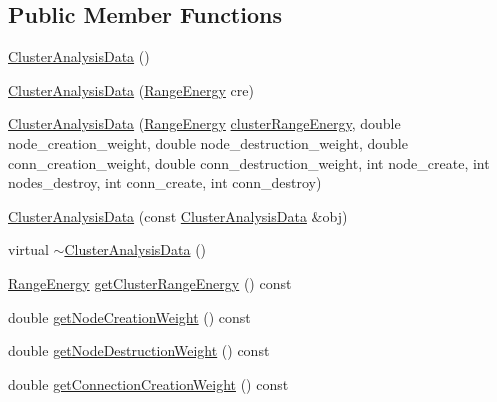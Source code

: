 \subsection*{\-Public \-Member \-Functions}
\begin{DoxyCompactItemize}
\item 
\hyperlink{classcryomesh_1_1manipulators_1_1ClusterAnalysisData_a98f5e73167b6c67c2ccaf323d2746eb5}{\-Cluster\-Analysis\-Data} ()
\item 
\hyperlink{classcryomesh_1_1manipulators_1_1ClusterAnalysisData_a3b924bf249e5da2908ba59e523178be0}{\-Cluster\-Analysis\-Data} (\hyperlink{structcryomesh_1_1manipulators_1_1ClusterAnalysisData_1_1RangeEnergy}{\-Range\-Energy} cre)
\item 
\hyperlink{classcryomesh_1_1manipulators_1_1ClusterAnalysisData_a2fa4c1fd92df8f5f84d7574598c44a31}{\-Cluster\-Analysis\-Data} (\hyperlink{structcryomesh_1_1manipulators_1_1ClusterAnalysisData_1_1RangeEnergy}{\-Range\-Energy} \hyperlink{classcryomesh_1_1manipulators_1_1ClusterAnalysisData_a2cc91850c86c1a09509266b639cbacdb}{cluster\-Range\-Energy}, double node\-\_\-creation\-\_\-weight, double node\-\_\-destruction\-\_\-weight, double conn\-\_\-creation\-\_\-weight, double conn\-\_\-destruction\-\_\-weight, int node\-\_\-create, int nodes\-\_\-destroy, int conn\-\_\-create, int conn\-\_\-destroy)
\item 
\hyperlink{classcryomesh_1_1manipulators_1_1ClusterAnalysisData_ac94a5b4dfcba2a089bcb2bb768efc27a}{\-Cluster\-Analysis\-Data} (const \hyperlink{classcryomesh_1_1manipulators_1_1ClusterAnalysisData}{\-Cluster\-Analysis\-Data} \&obj)
\item 
virtual \hyperlink{classcryomesh_1_1manipulators_1_1ClusterAnalysisData_a6a8af77c801c546b8286f7611d63240a}{$\sim$\-Cluster\-Analysis\-Data} ()
\item 
\hyperlink{structcryomesh_1_1manipulators_1_1ClusterAnalysisData_1_1RangeEnergy}{\-Range\-Energy} \hyperlink{classcryomesh_1_1manipulators_1_1ClusterAnalysisData_a671823e8f64d2525f3084e7ab82ce205}{get\-Cluster\-Range\-Energy} () const 
\item 
double \hyperlink{classcryomesh_1_1manipulators_1_1ClusterAnalysisData_a849a5a4bedbf3267883a34695d9fc832}{get\-Node\-Creation\-Weight} () const 
\item 
double \hyperlink{classcryomesh_1_1manipulators_1_1ClusterAnalysisData_a39954c2cfd0bf18ad011f1b637f02b26}{get\-Node\-Destruction\-Weight} () const 
\item 
double \hyperlink{classcryomesh_1_1manipulators_1_1ClusterAnalysisData_a59df774485e384f9706d12085cc1448a}{get\-Connection\-Creation\-Weight} () const 

\end{DoxyCompactItemize}
